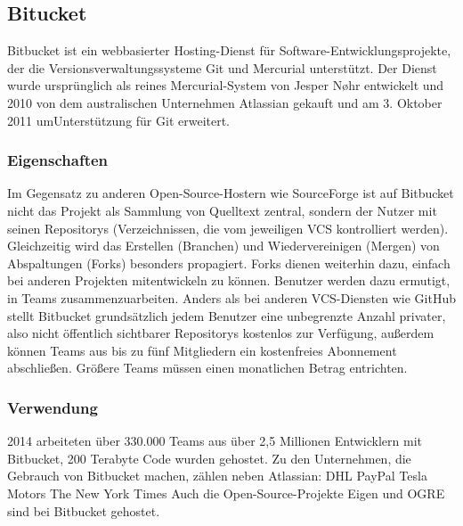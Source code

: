 \subsection{Bitucket}
Bitbucket ist ein webbasierter Hosting-Dienst für Software-Entwicklungsprojekte, der die Versionsverwaltungssysteme Git und Mercurial unterstützt. Der Dienst wurde ursprünglich als reines Mercurial-System von Jesper Nøhr entwickelt und 2010 von dem australischen Unternehmen Atlassian gekauft und am 3. Oktober 2011 umUnterstützung für Git erweitert.
\subsubsection{Eigenschaften}
Im Gegensatz zu anderen Open-Source-Hostern wie SourceForge ist auf Bitbucket nicht das Projekt als Sammlung von Quelltext zentral, sondern der Nutzer mit seinen Repositorys (Verzeichnissen, die vom jeweiligen VCS kontrolliert werden). Gleichzeitig wird das Erstellen (Branchen) und Wiedervereinigen (Mergen) von Abspaltungen (Forks) besonders propagiert. Forks dienen weiterhin dazu, einfach bei anderen Projekten mitentwickeln zu können.
Benutzer werden dazu ermutigt, in Teams zusammenzuarbeiten. Anders als bei anderen VCS-Diensten wie GitHub stellt Bitbucket grundsätzlich jedem Benutzer eine unbegrenzte Anzahl privater, also nicht öffentlich sichtbarer Repositorys kostenlos zur Verfügung, außerdem können Teams aus bis zu fünf Mitgliedern ein kostenfreies Abonnement abschließen. Größere Teams müssen einen monatlichen Betrag entrichten.
\subsubsection{Verwendung}
2014 arbeiteten über 330.000 Teams aus über 2,5 Millionen Entwicklern mit Bitbucket, 200 Terabyte Code wurden gehostet. Zu den Unternehmen, die Gebrauch von Bitbucket machen, zählen neben Atlassian:
DHL
PayPal
Tesla Motors
The New York Times
Auch die Open-Source-Projekte Eigen und OGRE sind bei Bitbucket gehostet.
